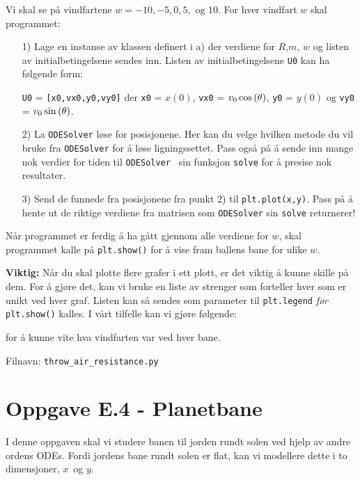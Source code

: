 \documentclass[10pt,a4paper]{article}
\begin{document}
Vi skal se på vindfartene $w = -10,-5,0,5,\text{ og }10$.
For hver vindfart $w$ skal programmet:
\begin{itemize}
\item[1)] Lage en instanse av klassen definert i a) der verdiene for $R$,$m$, $w$ og listen av initialbetingelsene sendes inn.  Listen av initialbetingelsene \texttt{U0} kan ha følgende form:  

\texttt{U0} = \texttt{[x0,vx0,y0,vy0]} der \texttt{x0} = $x(0)$, \texttt{vx0} = $v_0\cos\qty(\theta)$, \texttt{y0} = $y(0)$ og \texttt{vy0} = $v_0\sin\qty(\theta)$. 

\item[2)] La \texttt{ODESolver} løse for posisjonene. Her kan du velge hvilken metode du vil bruke fra \texttt{ODESolver} for å løse ligningssettet. Pass også på å sende inn mange nok verdier for tiden til \texttt{ODESolver } sin funksjon \texttt{solve} for å presise nok resultater. 

\item[3)] Send de funnede fra posisjonene fra punkt 2) til \texttt{plt.plot(x,y)}. Pass på å hente ut de riktige verdiene fra matrisen som \texttt{ODESolver} sin \texttt{solve} returnerer! 
\end{itemize}
Når programmet er ferdig å ha gått gjennom alle verdiene for $w$, skal programmet kalle på \texttt{plt.show()} for å vise fram ballens bane for ulike $w$. 

\textbf{Viktig:} Når du skal plotte flere grafer i ett plott, er det viktig å kunne skille på dem. For å gjøre det, kan vi bruke en liste av strenger som forteller hver som er unikt ved hver graf. Listen kan så sendes som parameter til \texttt{plt.legend} \textit{før} \texttt{plt.show()} kalles. I vårt tilfelle kan vi gjøre følgende:



for å kunne vite hva vindfarten var ved hver bane. 

Filnavn: \texttt{throw\_air\_resistance.py}


\section*{Oppgave E.4 - Planetbane}
I denne oppgaven skal vi studere banen til jorden rundt solen ved hjelp av andre ordens ODEs. Fordi jordens bane rundt solen er flat, kan vi modellere dette i to dimensjoner, $x$ og $y$.
\end{document}
